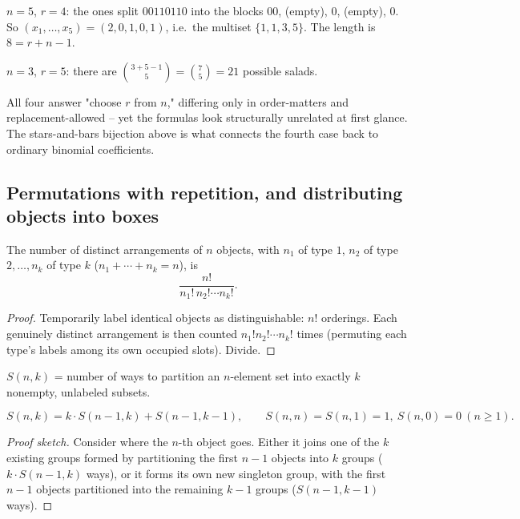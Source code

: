 \documentclass[11pt]{article}
\begin{document}
\begin{example}
$n=5$, $r=4$: the ones split $00110110$ into the blocks $00$, (empty), $0$, (empty), $0$. So $(x_1,\dots,x_5)=(2,0,1,0,1)$, i.e.\ the multiset $\{1,1,3,5\}$. The length is $8=r+n-1$.
\end{example}

\begin{example}
$n=3$, $r=5$: there are $\binom{3+5-1}{5}=\binom75=21$ possible salads.
\end{example}

\begin{note}
All four answer "choose $r$ from $n$," differing only in order-matters and replacement-allowed -- yet the formulas look structurally unrelated at first glance. The stars-and-bars bijection above is what connects the fourth case back to ordinary binomial coefficients.
\end{note}

\subsection{Permutations with repetition, and distributing objects into boxes}
\label{sec:8-9-2}

\begin{theorem}
The number of distinct arrangements of $n$ objects, with $n_1$ of type $1$, $n_2$ of type $2,\dots,n_k$ of type $k$ ($n_1+\cdots+n_k=n$), is
\[
\frac{n!}{n_1!\,n_2!\cdots n_k!}.
\]
\end{theorem}
\begin{proof}
Temporarily label identical objects as distinguishable: $n!$ orderings. Each genuinely distinct arrangement is then counted $n_1!n_2!\cdots n_k!$ times (permuting each type's labels among its own occupied slots). Divide.
\end{proof}

\bigskip
\begin{definition}
$S(n,k)$ = number of ways to partition an $n$-element set into exactly $k$ nonempty, unlabeled subsets.
\end{definition}

\begin{theorem}[Recurrence]
\[
S(n,k) = k\cdot S(n-1,k) + S(n-1,k-1), \qquad S(n,n)=S(n,1)=1,\ S(n,0)=0\ (n\ge1).
\]
\end{theorem}
\begin{proof}[Proof sketch]
Consider where the $n$-th object goes. Either it joins one of the $k$ existing groups formed by partitioning the first $n-1$ objects into $k$ groups ($k\cdot S(n-1,k)$ ways), or it forms its own new singleton group, with the first $n-1$ objects partitioned into the remaining $k-1$ groups ($S(n-1,k-1)$ ways).
\end{proof}
\end{document}
